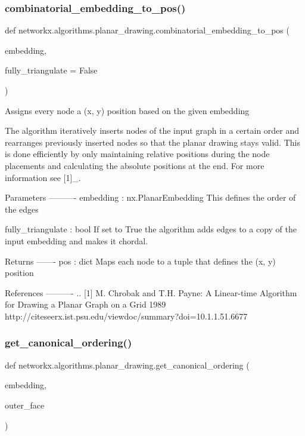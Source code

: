 \subsubsection{\texorpdfstring{combinatorial\+\_\+embedding\+\_\+to\+\_\+pos()}{combinatorial\_embedding\_to\_pos()}}
{\footnotesize\ttfamily def networkx.\+algorithms.\+planar\+\_\+drawing.\+combinatorial\+\_\+embedding\+\_\+to\+\_\+pos (\begin{DoxyParamCaption}\item[{}]{embedding,  }\item[{}]{fully\+\_\+triangulate = {\ttfamily False} }\end{DoxyParamCaption})}

\begin{DoxyVerb}Assigns every node a (x, y) position based on the given embedding

The algorithm iteratively inserts nodes of the input graph in a certain
order and rearranges previously inserted nodes so that the planar drawing
stays valid. This is done efficiently by only maintaining relative
positions during the node placements and calculating the absolute positions
at the end. For more information see [1]_.

Parameters
----------
embedding : nx.PlanarEmbedding
    This defines the order of the edges

fully_triangulate : bool
    If set to True the algorithm adds edges to a copy of the input
    embedding and makes it chordal.

Returns
-------
pos : dict
    Maps each node to a tuple that defines the (x, y) position

References
----------
.. [1] M. Chrobak and T.H. Payne:
    A Linear-time Algorithm for Drawing a Planar Graph on a Grid 1989
    http://citeseerx.ist.psu.edu/viewdoc/summary?doi=10.1.1.51.6677\end{DoxyVerb}
 \mbox{\label{namespacenetworkx_1_1algorithms_1_1planar__drawing_a5e561926d9c6866e89f8730fa371f029}} 
\subsubsection{\texorpdfstring{get\+\_\+canonical\+\_\+ordering()}{get\_canonical\_ordering()}}
{\footnotesize\ttfamily def networkx.\+algorithms.\+planar\+\_\+drawing.\+get\+\_\+canonical\+\_\+ordering (\begin{DoxyParamCaption}\item[{}]{embedding,  }\item[{}]{outer\+\_\+face }\end{DoxyParamCaption})}

